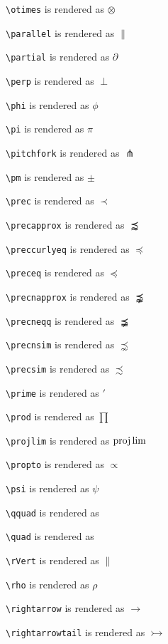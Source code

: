 \texttt{\textbackslash otimes} is rendered as $\otimes$

\texttt{\textbackslash parallel} is rendered as $\parallel$

\texttt{\textbackslash partial} is rendered as $\partial$

\texttt{\textbackslash perp} is rendered as $\perp$

\texttt{\textbackslash phi} is rendered as $\phi$

\texttt{\textbackslash pi} is rendered as $\pi$

\texttt{\textbackslash pitchfork} is rendered as $\pitchfork$

\texttt{\textbackslash pm} is rendered as $\pm$

\texttt{\textbackslash prec} is rendered as $\prec$

\texttt{\textbackslash precapprox} is rendered as $\precapprox$

\texttt{\textbackslash preccurlyeq} is rendered as $\preccurlyeq$

\texttt{\textbackslash preceq} is rendered as $\preceq$

\texttt{\textbackslash precnapprox} is rendered as $\precnapprox$

\texttt{\textbackslash precneqq} is rendered as $\precneqq$

\texttt{\textbackslash precnsim} is rendered as $\precnsim$

\texttt{\textbackslash precsim} is rendered as $\precsim$

\texttt{\textbackslash prime} is rendered as $\prime$

\texttt{\textbackslash prod} is rendered as $\prod$

\texttt{\textbackslash projlim} is rendered as $\projlim$

\texttt{\textbackslash propto} is rendered as $\propto$

\texttt{\textbackslash psi} is rendered as $\psi$

\texttt{\textbackslash qquad} is rendered as $\qquad$

\texttt{\textbackslash quad} is rendered as $\quad$

\texttt{\textbackslash rVert} is rendered as $\rVert$

\texttt{\textbackslash rho} is rendered as $\rho$

\texttt{\textbackslash rightarrow} is rendered as $\rightarrow$

\texttt{\textbackslash rightarrowtail} is rendered as $\rightarrowtail$

